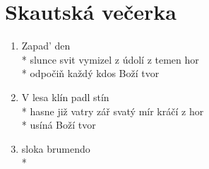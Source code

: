 \section{Skautská večerka}
\begin{enumerate}
\item Zapad' den \\*
slunce svit vymizel z údolí z temen hor \\*
odpočiň každý kdos Boží tvor 
\item V lesa klín padl stín \\*
hasne již vatry zář svatý mír kráčí z hor \\*
usíná Boží tvor 
\item sloka brumendo \\*
\end{enumerate}

